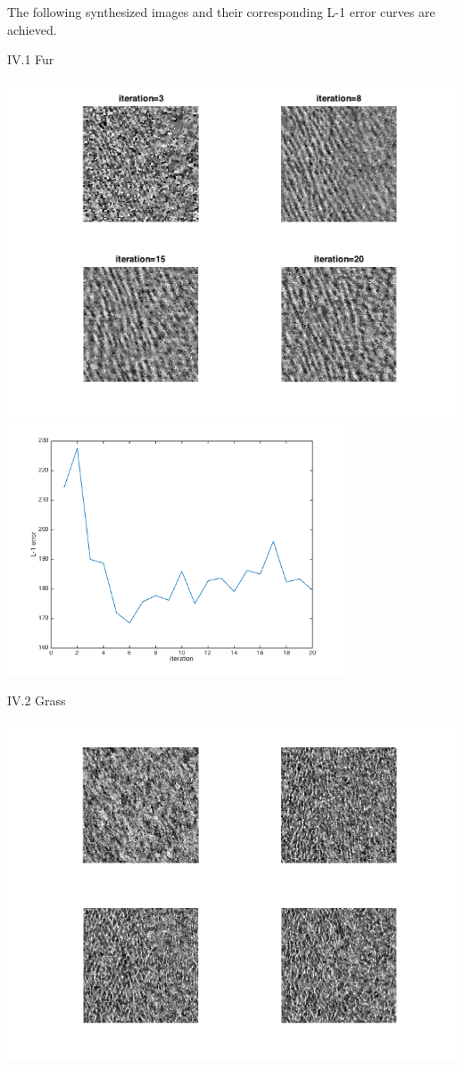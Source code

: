 \documentclass[12pt]{article}
\newenvironment{problem}[2][Part]{\begin{trivlist}
\item[\hskip \labelsep {\bfseries #1}\hskip \labelsep {\bfseries #2}]}{\end{trivlist}}
\begin{document}
\begin{problem}{IV Results}
\item{}
The following synthesized images and their corresponding L-1 error curves are achieved.
\item{IV.1 Fur}
\begin{center}
	\includegraphics[width=14cm]{Code/Results/fur.png}
	\includegraphics[width=10cm]{Code/Results/fur_error.png}
\end{center}
\item{IV.2 Grass}
\begin{center}
	\includegraphics[width=14cm]{Code/Results/grass.png}

\end{center}
\end{problem}
\end{document}
